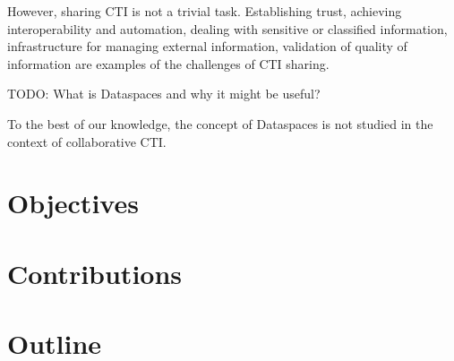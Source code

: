 However, sharing CTI is not a trivial task. Establishing trust, achieving interoperability and automation, dealing with sensitive or classified information, infrastructure for managing external information, validation of quality of information are examples of the challenges of CTI sharing. \cite{johnson_guide_2016}

TODO: What is Dataspaces and why it might be useful?

To the best of our knowledge, the concept of Dataspaces is not studied in the context of collaborative CTI.

\section{Objectives}


\section{Contributions}


\section{Outline}
